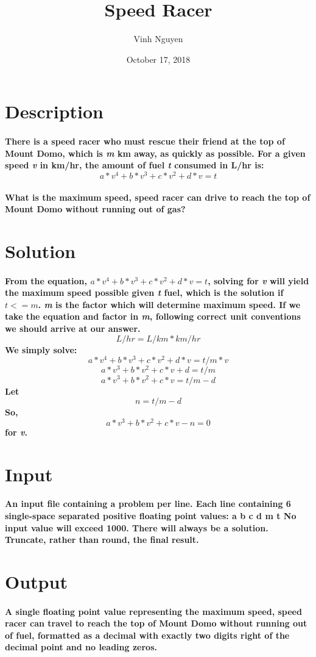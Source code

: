 \documentclass[12pt, oneside, a4paper]{article}
\begin{document}
\title{Speed Racer}
\author{Vinh Nguyen}
\date{October 17, 2018}
\maketitle
\newpage

\section*{Description}
	\paragraph{
		There is a speed racer who must rescue their friend at the top of Mount Domo,
		which is \emph{m} km away, as quickly as possible.  For a given speed 
		\emph{v} in km/hr, the amount of fuel \emph{t} consumed in L/hr is: 
		$$a*v^4 + b*v^3 + c*v^2 + d*v = t$$
	}
	\paragraph{
		What is the maximum speed, speed racer can drive to reach the top of Mount
		Domo without running out of gas?
	}
	
\section*{Solution}
	\paragraph{
		From the equation, $a*v^4 + b*v^3 + c*v^2 + d*v = t$, solving for \emph{v}
		will yield the maximum speed possible given \emph{t} fuel, which is the
		solution if $t <= m$.
		\hspace{0pt}
		\emph{m} is the factor which will determine maximum speed.  If we take the
		equation and factor in \emph{m}, following correct unit conventions we should
		arrive at our answer.
		$$L/hr = L/km * km/hr$$
		We simply solve: $$a*v^4 + b*v^3 + c*v^2 + d*v = t/m * v$$
						 $$a*v^3 + b*v^2 + c*v + d = t/m$$
						 $$a*v^3 + b*v^2 + c*v = t/m - d$$
						 Let $$n = t/m - d$$
						 So, $$a*v^3 + b*v^2 + c*v - n = 0$$
		for \emph{v}.
	}
\newpage

\section*{Input}
	\paragraph{
		An input file containing a problem per line.\hspace{0pt}
		Each line containing 6 single-space separated positive floating point values:
		a b c d m t
		No input value will exceed 1000.  
		There will always be a solution.
		Truncate, rather than round, the final result.
	}	

\section*{Output}
	\paragraph{
		A single floating point value representing the maximum speed, speed racer can
		travel to reach the top of Mount Domo without running out of fuel, formatted
		as a decimal with exactly two digits right of the decimal point and no leading
		zeros.
	}
	
\end{document}
